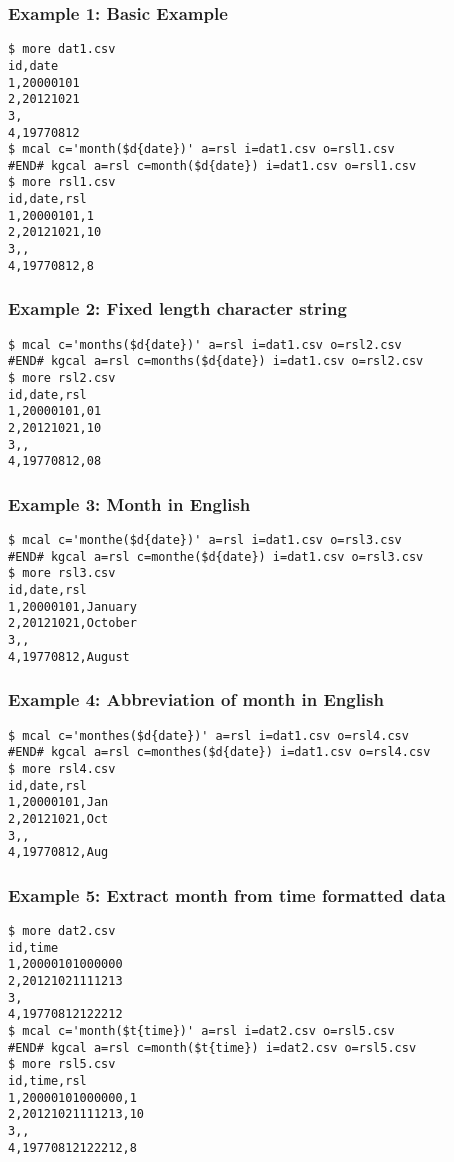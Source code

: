 \subsubsection*{Example 1: Basic Example}



\begin{Verbatim}[baselinestretch=0.7,frame=single]
$ more dat1.csv
id,date
1,20000101
2,20121021
3,
4,19770812
$ mcal c='month($d{date})' a=rsl i=dat1.csv o=rsl1.csv
#END# kgcal a=rsl c=month($d{date}) i=dat1.csv o=rsl1.csv
$ more rsl1.csv
id,date,rsl
1,20000101,1
2,20121021,10
3,,
4,19770812,8
\end{Verbatim}
\subsubsection*{Example 2: Fixed length character string}



\begin{Verbatim}[baselinestretch=0.7,frame=single]
$ mcal c='months($d{date})' a=rsl i=dat1.csv o=rsl2.csv
#END# kgcal a=rsl c=months($d{date}) i=dat1.csv o=rsl2.csv
$ more rsl2.csv
id,date,rsl
1,20000101,01
2,20121021,10
3,,
4,19770812,08
\end{Verbatim}
\subsubsection*{Example 3: Month in English}



\begin{Verbatim}[baselinestretch=0.7,frame=single]
$ mcal c='monthe($d{date})' a=rsl i=dat1.csv o=rsl3.csv
#END# kgcal a=rsl c=monthe($d{date}) i=dat1.csv o=rsl3.csv
$ more rsl3.csv
id,date,rsl
1,20000101,January
2,20121021,October
3,,
4,19770812,August
\end{Verbatim}
\subsubsection*{Example 4: Abbreviation of month in English}



\begin{Verbatim}[baselinestretch=0.7,frame=single]
$ mcal c='monthes($d{date})' a=rsl i=dat1.csv o=rsl4.csv
#END# kgcal a=rsl c=monthes($d{date}) i=dat1.csv o=rsl4.csv
$ more rsl4.csv
id,date,rsl
1,20000101,Jan
2,20121021,Oct
3,,
4,19770812,Aug
\end{Verbatim}
\subsubsection*{Example 5: Extract month from time formatted data}



\begin{Verbatim}[baselinestretch=0.7,frame=single]
$ more dat2.csv
id,time
1,20000101000000
2,20121021111213
3,
4,19770812122212
$ mcal c='month($t{time})' a=rsl i=dat2.csv o=rsl5.csv
#END# kgcal a=rsl c=month($t{time}) i=dat2.csv o=rsl5.csv
$ more rsl5.csv
id,time,rsl
1,20000101000000,1
2,20121021111213,10
3,,
4,19770812122212,8
\end{Verbatim}

